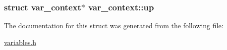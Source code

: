 \subsubsection[{\texorpdfstring{up}{up}}]{\setlength{\rightskip}{0pt plus 5cm}struct {\bf var\+\_\+context}$\ast$ var\+\_\+context\+::up}\hypertarget{structvar__context_a69daf990f55d7823ee3ee80ae9ae4b4a}{}\label{structvar__context_a69daf990f55d7823ee3ee80ae9ae4b4a}


The documentation for this struct was generated from the following file\+:\begin{DoxyCompactItemize}
\item 
\hyperlink{variables_8h}{variables.\+h}\end{DoxyCompactItemize}
